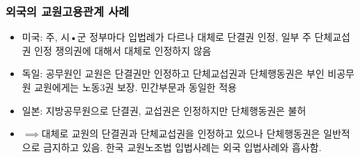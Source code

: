 \documentclass[aspectratio=169,xcolor=dvipsnames,handout]{beamer}
\begin{document}
\begin{frame}[allowframebreaks]
    \frametitle{외국의 교원고용관계 사례}
    \begin{itemize}[<+->]
        \item 미국: 주, 시•군 정부마다 입법례가 다르나 대체로 단결권 인정, 일부 주 단체교섭권 인정 쟁의권에 대해서 대체로 인정하지 않음
        \item 독일: 공무원인 교원은 단결권만 인정하고 단체교섭권과 단체행동권은 부인 비공무원 교원에게는 노동3권 보장. 민간부문과 동일한 적용
        \item 일본: 지방공무원으로 단결권, 교섭권은 인정하지만 단체행동권은 불허
        \item $\implies$대체로 교원의 단결권과 단체교섭권을 인정하고 있으나 단체행동권은 일반적으로 금지하고 있음. 한국 교원노조법 입법사례는 외국 입법사례와 흡사함. 
    \end{itemize}
\end{frame}


\end{document}
